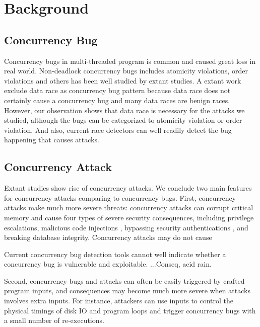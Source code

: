 \section{Background}\label{sec:background}

\subsection{Concurrency Bug}

Concurrency bugs in multi-threaded program is common and caused great loss in real world. 
Non-deadlock concurrency bugs includes 
atomicity violations\cite{}, order violations\cite{} and others  has been well studied 
by extant studies\cite{lu:concurrency-bugs,conmem:asplos10}. 
A extant work exclude data race as concurrency bug pattern 
because data race does not certainly cause a concurrency bug\cite{lu:concurrency-bugs} and many data races are benign races. 
However, our observation shows that data race is necessary for the attacks we studied, 
although the bugs can be categorized to atomicity violation or order violation. 
And also, current race detectors can well readily detect the bug happening that causes attacks.


 
\subsection{Concurrency Attack}
Extant studies \cite{con:hotpar12, acidrain:sigmod17} show rise of concurrency 
attacks. We conclude two main features for concurrency attacks comparing to concurrency bugs. 
First, concurrency attacks make much more severe threats:
concurrency attacks can corrupt critical memory and cause four
types of severe security consequences, including privilege escalations\cite{uselib-bug-12791, mysql-bug-24988},
malicious code injections \cite{msiexploit},  
bypassing security authentications\cite{cve-2010-0923, cve-2008-0034, cve-2010-1754}
, and breaking database integrity\cite{acidrain:sigmod17}. 
Concurrency attacks may do not cause 

Current concurrency bug detection tools cannot well indicate whether a concurrency bug is vulnerable and exploitable.
...Conseq, acid rain.

Second, concurrency bugs and attacks can often be easily
triggered by crafted program inputs, and consequences may 
become much more severe when attacks involves extra inputs.  
For instance, attackers
can use inputs to control the physical timings of disk
IO and program loops and trigger concurrency bugs with a
small number of re-executions. 

